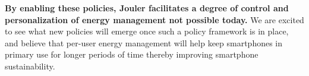 \textbf{By enabling these policies, Jouler facilitates a degree of control
and personalization of energy management not possible today.} We are excited
to see what new policies will emerge once such a policy framework is in
place, and believe that per-user energy management will help keep smartphones
in primary use for longer periods of time thereby improving smartphone
sustainability.

